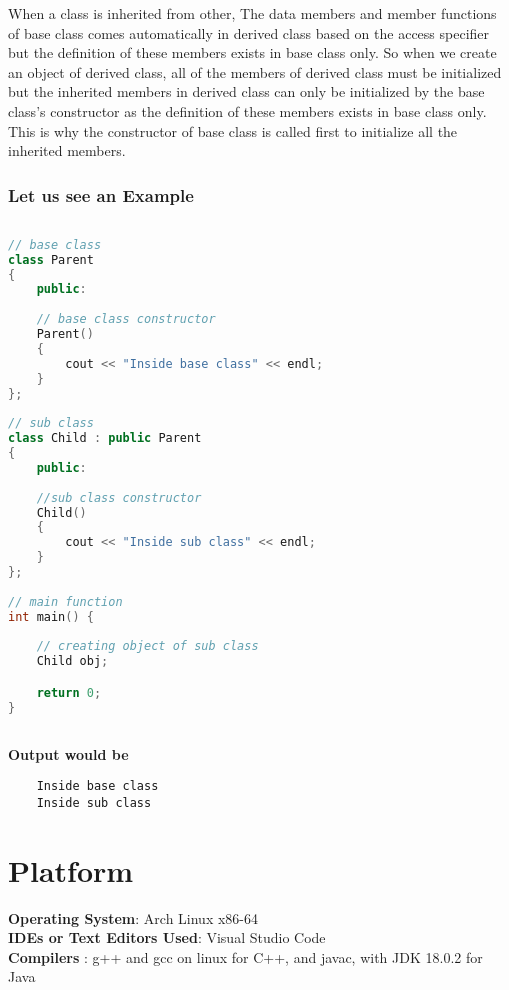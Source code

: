 \documentclass[11pt]{article}
\begin{document}
When a class is inherited from other, The data members and member functions of base class comes automatically in derived class based on the access specifier but the definition of these members exists in base class only. So when we create an object of derived class, all of the members of derived class must be initialized but the inherited members in derived class can only be initialized by the base class's constructor as the definition of these members exists in base class only. \\

This is why the constructor of base class is called first to initialize all the inherited members. 

\subsubsection*{Let us see an Example}

\begin{lstlisting}[language = C++]
 
// base class
class Parent
{
    public:
     
    // base class constructor
    Parent()
    {
        cout << "Inside base class" << endl;
    }
};
 
// sub class
class Child : public Parent
{
    public:
     
    //sub class constructor
    Child()
    {
        cout << "Inside sub class" << endl;
    }
};
 
// main function
int main() {
      
    // creating object of sub class
    Child obj;

    return 0;
}
	
\end{lstlisting}
\textbf{Output would be}
\begin{verbatim}
	Inside base class
	Inside sub class
\end{verbatim}

\section{Platform}
\textbf{Operating System}: Arch Linux x86-64\\
\textbf{IDEs or Text Editors Used}: Visual Studio Code\\
\textbf{Compilers} : g++ and gcc on linux for C++, and javac, with JDK 18.0.2 for Java\\
\end{document}
